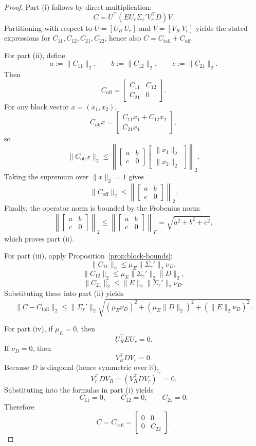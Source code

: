\documentclass[11pt]{article}
\begin{document}
\begin{proof}
Part (i) follows by direct multiplication:
\[
C
=
U^\top (E U_r \Sigma_r' V_r^\top D) V.
\]
Partitioning with respect to \(U=[U_R\ U_r]\) and \(V=[V_R\ V_r]\) yields the stated expressions for \(C_{11},C_{12},C_{21},C_{22}\), hence also
\(
C = C_{\mathrm{tail}} + C_{\mathrm{off}}.
\)

For part (ii), define
\[
a:=\|C_{11}\|_2,\qquad
b:=\|C_{12}\|_2,\qquad
c:=\|C_{21}\|_2.
\]
Then
\[
C_{\mathrm{off}}
=
\begin{bmatrix}
C_{11} & C_{12}\\
C_{21} & 0
\end{bmatrix}.
\]
For any block vector \(x=(x_1,x_2)\),
\[
C_{\mathrm{off}}x
=
\begin{bmatrix}
C_{11}x_1 + C_{12}x_2\\
C_{21}x_1
\end{bmatrix},
\]
so
\[
\|C_{\mathrm{off}}x\|_2
\le
\left\|
\begin{bmatrix}
a & b\\
c & 0
\end{bmatrix}
\begin{bmatrix}
\|x_1\|_2\\
\|x_2\|_2
\end{bmatrix}
\right\|_2.
\]
Taking the supremum over \(\|x\|_2=1\) gives
\[
\|C_{\mathrm{off}}\|_2
\le
\left\|
\begin{bmatrix}
a & b\\
c & 0
\end{bmatrix}
\right\|_2.
\]
Finally, the operator norm is bounded by the Frobenius norm:
\[
\left\|
\begin{bmatrix}
a & b\\
c & 0
\end{bmatrix}
\right\|_2
\le
\left\|
\begin{bmatrix}
a & b\\
c & 0
\end{bmatrix}
\right\|_F
=
\sqrt{a^2+b^2+c^2},
\]
which proves part (ii).

For part (iii), apply Proposition~\ref{prop:block-bounds}:
\[
\|C_{11}\|_2 \le \mu_E \|\Sigma_r'\|_2 \nu_D,
\]
\[
\|C_{12}\|_2 \le \mu_E \|\Sigma_r'\|_2 \|D\|_2,
\]
\[
\|C_{21}\|_2 \le \|E\|_2 \|\Sigma_r'\|_2 \nu_D.
\]
Substituting these into part (ii) yields
\[
\|C-C_{\mathrm{tail}}\|_2
\le
\|\Sigma_r'\|_2
\sqrt{
(\mu_E\nu_D)^2
+
(\mu_E\|D\|_2)^2
+
(\|E\|_2\nu_D)^2
}.
\]

For part (iv), if \(\mu_E=0\), then
\[
U_R^\top E U_r = 0.
\]
If \(\nu_D=0\), then
\[
V_R^\top D V_r = 0.
\]
Because \(D\) is diagonal (hence symmetric over \(\mathbb{R}\)),
\[
V_r^\top D V_R = (V_R^\top D V_r)^\top = 0.
\]
Substituting into the formulas in part (i) yields
\[
C_{11}=0,\qquad C_{12}=0,\qquad C_{21}=0.
\]
Therefore
\[
C=C_{\mathrm{tail}}
=
\begin{bmatrix}
0 & 0\\
0 & C_{22}
\end{bmatrix}.
\]
\end{proof}
\end{document}
